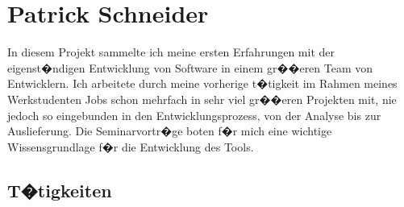 \section{Patrick Schneider}

In diesem Projekt sammelte ich meine ersten Erfahrungen mit der eigenst�ndigen Entwicklung von Software in einem gr��eren Team von Entwicklern. Ich arbeitete durch meine vorherige t�tigkeit im Rahmen meines Werkstudenten Jobs schon mehrfach in sehr viel gr��eren Projekten mit, nie jedoch so eingebunden in den Entwicklungsprozess, von der Analyse bis zur Auslieferung. 
Die Seminarvortr�ge boten f�r mich eine wichtige Wissensgrundlage f�r die Entwicklung des Tools.


\subsection{T�tigkeiten}

